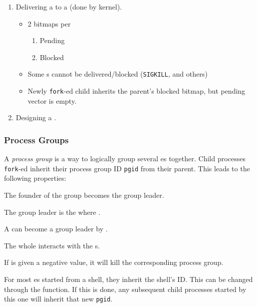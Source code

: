 \begin{enumerate}[noitemsep]
\item Delivering a  to a  (done by kernel).
  \begin{itemize}[noitemsep]
  \item 2 bitmaps per 
    \begin{enumerate}[noitemsep]
    \item Pending
    \item Blocked
    \end{enumerate}
  \item Some s cannot be delivered/blocked (\texttt{SIGKILL}, and others)
  \item Newly \texttt{fork}-ed child inherits the parent's blocked bitmap, but pending vector is empty.
  \end{itemize}

\item Designing a .
\end{enumerate}

\subsubsection{Process Groups}\label{subsubsec:Process_Groups}
\begin{definition}\label{def:Process_Group}
  A \emph{process group} is a way to logically group several es together.
  Child processes \texttt{fork}-ed inherit their process group ID \texttt{pgid} from their parent.
  This leads to the following properties:
  \begin{propertylist}
  \item The founder of the group becomes the group leader.
  \item The group leader is the  where .
  \item A  can become a group leader by .
  \item The whole  interacts with the s.
  \item If  is given a negative value, it will kill the corresponding process group.
  \end{propertylist}
\end{definition}

\begin{remark*}
  For most es started from a shell, they inherit the shell's  ID.\@
  This can be changed through the  function.
  If this is done, any subsequent child processes started by this one will inherit that new \texttt{pgid}.
\end{remark*}

